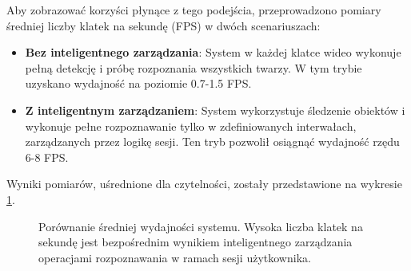 Aby zobrazować korzyści płynące z tego podejścia, przeprowadzono pomiary średniej liczby klatek na sekundę (FPS) w dwóch scenariuszach:
\begin{itemize}
    \item \textbf{Bez inteligentnego zarządzania}: System w każdej klatce wideo wykonuje pełną detekcję i próbę rozpoznania wszystkich twarzy. W tym trybie uzyskano wydajność na poziomie 0.7-1.5 FPS.
    \item \textbf{Z inteligentnym zarządzaniem}: System wykorzystuje śledzenie obiektów i wykonuje pełne rozpoznawanie tylko w zdefiniowanych interwałach, zarządzanych przez logikę sesji. Ten tryb pozwolił osiągnąć wydajność rzędu 6-8 FPS.
\end{itemize}

Wyniki pomiarów, uśrednione dla czytelności, zostały przedstawione na wykresie \ref{fig:wydajnosc_fps}.

\begin{figure}[h!]
    \centering
    \caption{Porównanie średniej wydajności systemu. Wysoka liczba klatek na sekundę jest bezpośrednim wynikiem inteligentnego zarządzania operacjami rozpoznawania w ramach sesji użytkownika.}
    \label{fig:wydajnosc_fps}
\end{figure}
